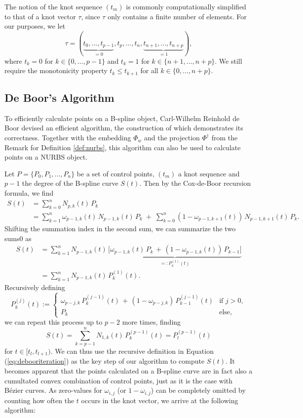 \documentclass[a4paper, 11pt]{report}
\theoremstyle{definition}
\begin{document}
	The notion of the knot sequence $(t_m)$ is commonly computationally simplified to that of a knot vector $\tau$, since $\tau$ only contains a finite number of elements. For our purposes, we let
		$$\tau = (\underbrace {t_0, ..., t_{p-1}}_{= 0}, t_p, ..., t_n, \underbrace{t_{n+1}, ..., t_{n+p}}_{= 1}),$$
	where $t_k = 0$ for $k \in \{0,...,p-1\}$ and $t_k = 1$ for $k \in \{n+1, ..., n+p\}$. We still require the monotonicity property $t_k \leq t_{k+1}$ for all $k \in \{0, ..., n+p\}$.

\subsection{De Boor's Algorithm}
	To efficiently calculate points on a B-spline object, Carl-Wilhelm Reinhold de Boor devised an efficient algorithm, the construction of which demonstrates its correctness. Together with the embedding $\Phi_w$ and the projection $\Phi^\dagger$ from the Remark for Definition \ref{def:nurbs}, this algorithm can also be used to calculate points on a NURBS object.

	Let $P = \{P_0, P_1, ..., P_n\}$ be a set of control points, $(t_m)$ a knot sequence and $p-1$ the degree of the B-spline curve $S(t)$. Then by the Cox-de-Boor recursion formula, we find
	\begin{align*}
		S(t) 	&= \sum_{k=0}^n N_{p,k}(t) \, P_k \\
				&= \sum_{k=1}^n \omega_{p-1,k}(t) \, N_{p-1, k}(t) \, P_k  \; + \; \sum_{k=0}^n \left( 1-\omega_{p-1,k+1}(t) \right) \, N_{p-1, k+1}(t) \, P_k.
	\end{align*}
	Shifting the summation index in the second sum, we can summarize the two sums0 as
	\begin{align*} 
		S(t) 	&= \sum_{k=1}^n N_{p-1, k}(t) \, \underbrace{\Big[ \omega_{p-1,k}(t) \, P_k  \, + \, \left( 1-\omega_{p-1,k}(t) \right) \, P_{k-1} \Big]}_{=: P_k^{(1)}(t)} \\
				&= \sum_{k=1}^n N_{p-1, k}(t) \, P_k^{(1)}(t).
	\end{align*}
	Recursively defining
	\begin{equation}\label{eq:debooriteration}
		P^{(j)}_k(t) := \begin{cases}
			\omega_{p-j, k} \, P^{(j-1)}_k(t) \, + \, (1-\omega_{p-j, k}) \, P^{(j-1)}_{k-1}(t) 	&\text{if } j > 0,\\
			P_k 																					&\text{else},
		\end{cases}
	\end{equation}
	we can repeat this process up to $p-2$ more times, finding
	$$ S(t) = \sum_{k=p-1}^n N_{1, k}(t) \, P^{(p-1)}_k(t) = P^{(p-1)}_l(t)$$
	for $t \in [t_l, t_{l+1})$. We can thus use the recursive definition in Equation (\ref{eq:debooriteration}) as the key step of our algorithm to compute $S(t)$. It becomes apparent that the points calculated on a B-spline curve are in fact also a cumultated convex combination of control points, just as it is the case with Bézier curves. As zero-values for $\omega_{i,j}$ (or $1-\omega_{i,j}$) can be completely omitted by counting how often the $t$ occurs in the knot vector, we arrive at the following algorithm:
\end{document}
